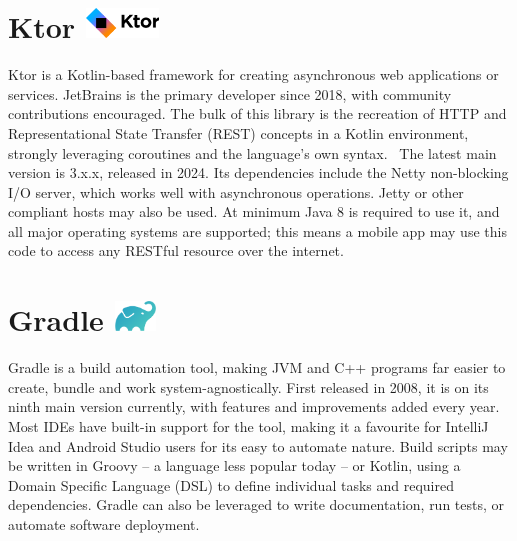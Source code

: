 \section{Ktor {\hspace{1cm}\includegraphics[height=8mm, keepaspectratio]{images/ktor_logo.png}}}

Ktor is a Kotlin-based framework for creating asynchronous web applications or services. JetBrains is the primary developer since 2018, with community contributions encouraged. The bulk of this library is the recreation of HTTP and Representational State Transfer (REST) concepts in a Kotlin environment, strongly leveraging coroutines and the language's own syntax.~\cite{KtorDocs} The latest main version is 3.x.x, released in 2024. Its dependencies include the Netty non-blocking I/O server, which works well with asynchronous operations. Jetty or other compliant hosts may also be used. At minimum Java 8 is required to use it, and all major operating systems are supported; this means a mobile app may use this code to access any RESTful resource over the internet.



\section{Gradle {\hspace{1cm}\includegraphics[height=8mm, keepaspectratio]{images/gradle_logo.png}}}

Gradle is a build automation tool, making JVM and C++ programs far easier to create, bundle and work system-agnostically.\cite{GradleDocs} First released in 2008, it is on its ninth main version currently, with features and improvements added every year. Most IDEs have built-in support for the tool, making it a favourite for IntelliJ Idea and Android Studio users for its easy to automate nature. Build scripts may be written in Groovy -- a language less popular today -- or Kotlin, using a Domain Specific Language (DSL) to define individual tasks and required dependencies. Gradle can also be leveraged to write documentation, run tests, or automate software deployment.